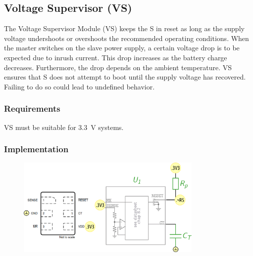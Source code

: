 \subsection{Voltage Supervisor (VS)}

The Voltage Supervisor Module (VS) keeps the \mu S in reset as long as the supply voltage
undershoots or overshoots the recommended operating conditions. When the master switches on
the slave power supply, a certain voltage drop is to be expected due to inrush current.
This drop increases as the battery charge decreases. Furthermore, the drop depends on the
ambient temperature. VS ensures that \mu S does not attempt to boot until
the supply voltage has recovered. Failing to do so could lead to undefined behavior.

\subsubsection{Requirements}

VS must be suitable for \SI{3.3}{\volt} systems.

\subsubsection{Implementation}


\begin{figure}[h]
    \centering
    \includegraphics[width=0.8\textwidth]{SL/VS/VS}
\end{figure}



\clearpage